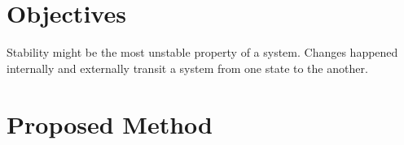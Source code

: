 \documentclass{article}
\begin{document}


\section{Objectives}
  
  Stability might be the most unstable property of a system. Changes happened internally and externally transit a system from one state to the another.
  

\section{Proposed Method}
  \label{proposed_method}

\end{document}
